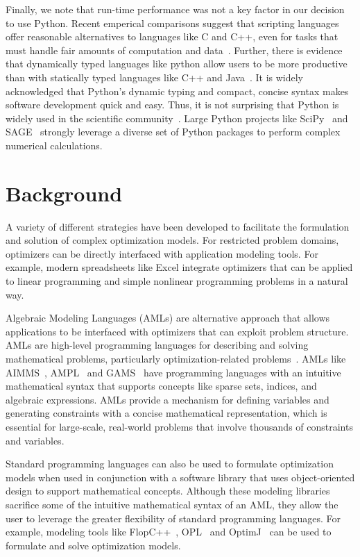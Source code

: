 Finally, we note that run-time performance was not a key factor in
our decision to use Python.  Recent emperical comparisons suggest
that scripting languages offer reasonable alternatives to languages
like C and C++, even for tasks that must handle fair amounts of
computation and data~\citep{621567}.  Further, there is evidence
that dynamically typed languages like python allow users to be
more productive than with statically typed languages like C++ and
Java~\citep{tratt__dyamically_typed_languages,PythonVSJava}.  It is widely
acknowledged that Python's dynamic typing and compact, concise syntax
makes software development quick and easy.   Thus, it is not surprising
that Python is widely used in the scientific community~\citep{Oli07}.
Large Python projects like SciPy~\citep{SciPy} and SAGE~\citep{SAGE}
strongly leverage a diverse set of Python packages to perform complex
numerical calculations.




\section{Background}
\label{sec:bg}

A variety of different strategies have been developed to facilitate the
formulation and solution of complex optimization models.  For restricted
problem domains, optimizers can be directly interfaced with application
modeling tools.  For example, modern spreadsheets like Excel integrate
optimizers that can be applied to linear programming and simple nonlinear
programming problems in a natural way.

Algebraic Modeling Languages (AMLs) are alternative approach that allows
applications to be interfaced with optimizers that can exploit problem
structure.  AMLs are high-level programming languages for describing
and solving mathematical problems, particularly optimization-related
problems~\citep{Kal04}.  AMLs like AIMMS~\citep{AIMMS},
AMPL~\citep{AMPL,FouGay03} and GAMS~\citep{GAMS} have programming
languages with an intuitive mathematical syntax that supports concepts
like sparse sets, indices, and algebraic expressions.  AMLs provide
a mechanism for defining variables and generating constraints with a
concise mathematical representation, which is essential for large-scale,
real-world problems that involve thousands of constraints and variables.


Standard programming languages can also be used to formulate optimization
models when used  in conjunction with a software library that uses
object-oriented design to support mathematical concepts.
Although these modeling libraries sacrifice some of the intuitive
mathematical syntax of an AML, they allow the user to leverage the
greater flexibility of standard programming languages.  For example,
modeling tools like FlopC++~\citep{flopcpp}, OPL~\citep{OPL} and
OptimJ~\citep{OptimJ} can be used to formulate and solve optimization models.

